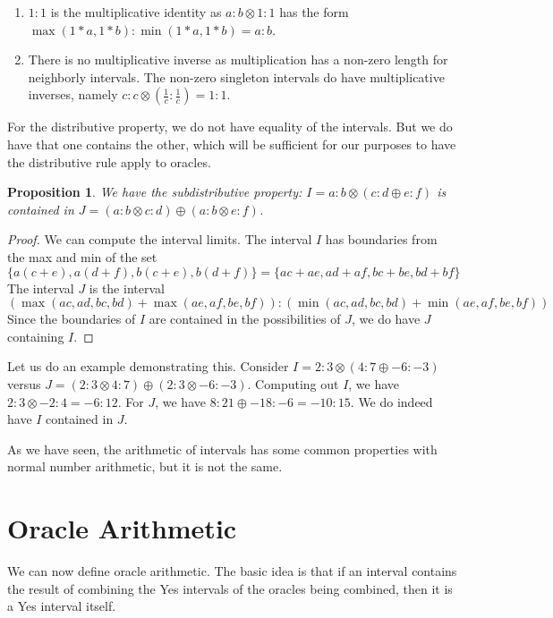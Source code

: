 \documentclass[12pt]{article}
\newtheorem{proposition}{Proposition}
\theoremstyle{remark}
\begin{document}
\begin{enumerate}
    \item $1:1$ is the multiplicative identity as $a:b \otimes 1:1$ has the form $\max(1*a, 1*b):\min(1*a, 1*b) = a:b$. 
    \item There is no multiplicative inverse as multiplication has a non-zero length for neighborly intervals. The non-zero singleton intervals do have multiplicative inverses, namely $c:c  \otimes  (\frac{1}{c} : \frac{1}{c}) = 1:1$.
\end{enumerate}

For the distributive property, we do not have equality of the intervals. But we do have that one contains the other, which will be sufficient for our purposes to have the distributive rule apply to oracles. 

\begin{proposition}
We have the subdistributive property: $I = a:b\otimes(c:d \oplus e:f)$ is contained in $J = (a:b \otimes c:d) \oplus (a:b \otimes e:f)$. 
\end{proposition}

\begin{proof}
We can compute the interval limits. The interval $I$ has boundaries from the max and min of the set 
\[
\{a(c+e), a(d+f), b(c+e), b(d+f)\} = \{ac+ae, ad+af, bc+be, bd+bf\}
\] 
The interval $J$ is the interval 
\[
(\max(ac, ad, bc, bd) + \max(ae, af, be, bf) ) : (\min(ac, ad, bc, bd) + \min(ae, af, be, bf) )
\]
Since the boundaries of $I$ are contained in the possibilities of $J$, we do have $J$ containing $I$.
\end{proof}

Let us do an example demonstrating this. Consider $I = 2:3 \otimes ( 4:7 \oplus -6:-3)$ versus $J = (2:3 \otimes 4:7) \oplus (2:3 \otimes -6:-3)$. Computing out $I$, we have $2:3 \otimes -2:4 = -6:12$. For $J$, we have $8:21 \oplus -18:-6 = -10: 15$. We do indeed have $I$ contained in $J$.

As we have seen, the arithmetic of intervals has some common properties with normal number arithmetic, but it is not the same.

\section{Oracle Arithmetic}

We can now define oracle arithmetic. The basic idea is that if an interval contains the result of combining the Yes intervals of the oracles being combined, then it is a Yes interval itself. 
\end{document}
